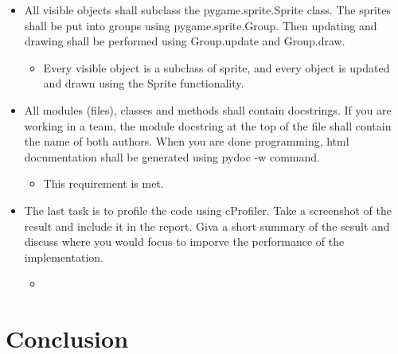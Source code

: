 \documentclass{article}
\begin{document}
\begin{itemize}
\begin{itemize}
	\end{itemize}
	\item All visible objects shall subclass the pygame.sprite.Sprite class. The sprites shall be put into groups using pygame.sprite.Group. Then updating and drawing shall be performed using Group.update and Group.draw. 
	\begin{itemize}
		\item Every visible object is a subclass of sprite, and every object is updated and drawn using the Sprite functionality.
	\end{itemize}
	\item All modules (files), classes and methods shall contain docstrings. If you are working in a team, the module docstring at the top of the file shall contain the name of both authors. When you are done programming, html documentation shall be generated using pydoc -w command.
	\begin{itemize}
		\item This requirement is met.
	\end{itemize}
	\item The last task is to profile the code using cProfiler. Take a screenshot of the result and include it in the report. Giva a short summary of the sesult and discuss where you would focus to imporve the performance of the implementation.
	\begin{itemize}
		\item 
	\end{itemize}
\end{itemize}

\section{Conclusion}
\paragraph{}
\end{document}
